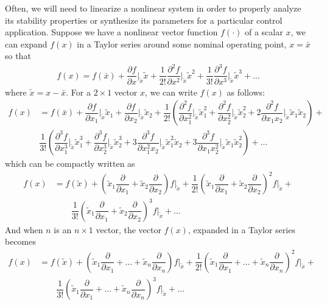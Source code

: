 Often, we will need to linearize a nonlinear system in order to properly analyze its stability properties or synthesize its parameters for a particular control application. Suppose we have a nonlinear vector function $f(\cdot)$ of a scalar $x$, we can expand $f(x)$ in a Taylor series around some nominal operating point, $x = \bar{x}$ so that 
%
\begin{align}
	f(x) = f(\bar{x}) + \dfrac{\partial f}{\partial x} \bigg\rvert_{\tilde{x}} \tilde{x}+ \dfrac{1}{2!} \dfrac{\partial^2f}{\partial x^2} \bigg\rvert_{\tilde{x}} \tilde{x}^2 + \dfrac{1}{3!} \dfrac{\partial^3f}{\partial x^3} \bigg\rvert_{\tilde{x}} \tilde{x}^3 +  \ldots
\end{align}
%
where $\tilde{x} = x - \bar{x}$. For a $2 \times 1$ vector $x$, we can write $f(x)$ as follows:
%
\begin{align}
	f(x) &= f(\bar{x}) + \dfrac{\partial f}{\partial x_1} \bigg\rvert_{\tilde{x}} \tilde{x}_1 + \dfrac{\partial f}{\partial x_2} \bigg\rvert_{\tilde{x}} \tilde{x}_2 + \dfrac{1}{2!} \left(\dfrac{\partial^2f}{\partial x_1^2} \bigg\rvert_{\tilde{x}} \tilde{x}_1^2 + \dfrac{\partial^2f}{\partial x_2^2} \bigg\rvert_{\tilde{x}} \tilde{x}_2^2 + 2 \dfrac{\partial ^2 f}{\partial x_1 x_2}\bigg \rvert_{\tilde{x}} \tilde{x}_1 \tilde{x}_2 \right) + \nonumber \\
	& 
	\dfrac{1}{3!} \left(\dfrac{\partial^3f}{\partial x_1^3} \bigg\rvert_{\tilde{x}} \tilde{x}_1^3 + \dfrac{\partial^3f}{\partial x_2^3} \bigg\rvert_{\tilde{x}} \tilde{x}_2^3 + 3 \dfrac{\partial ^3 f}{\partial x_1^2 x_2}\bigg \rvert_{\tilde{x}} \tilde{x}_1^2  \tilde{x}_2 + 3 \dfrac{\partial ^3 f}{\partial x_1 x_2^2}\bigg \rvert_{\tilde{x}} \tilde{x}_1  \tilde{x}_2^2  \right) + \ldots
\end{align}
 which can be compactly written as 
 \begin{align}
 	f(x) & = f(\tilde{x}) + \left(\tilde{x}_1 \dfrac{\partial}{\partial x_1} + \tilde{x}_2 \dfrac{\partial}{\partial x_2}\right)f\bigg\rvert_{\tilde{x}} +
 	\dfrac{1}{2!} \left(\tilde{x}_1 \dfrac{\partial}{\partial x_1} + \tilde{x}_2 \dfrac{\partial}{\partial x_2}\right)^2f\bigg\rvert_{\tilde{x}} + \nonumber \\
 	& 
 	\qquad \dfrac{1}{3!}\left(\tilde{x}_1 \dfrac{\partial}{\partial x_1} + \tilde{x}_2 \dfrac{\partial}{\partial x_2}\right)^3f\bigg\rvert_{\tilde{x}} + \ldots
 \end{align}
%
And when $n$ is an $n\times 1$ vector, the vector $f(x)$, expanded in a Taylor series becomes
%
\begin{align}
	f(x) &=  f(\tilde{x}) + \left(\tilde{x}_1 \dfrac{\partial}{\partial x_1} + \ldots + \tilde{x}_n \dfrac{\partial}{\partial x_n}\right)f\bigg\rvert_{\tilde{x}} +
	\dfrac{1}{2!} \left(\tilde{x}_1 \dfrac{\partial}{\partial x_1} + \ldots + \tilde{x}_n \dfrac{\partial}{\partial x_n}\right)^2f\bigg\rvert_{\tilde{x}} + \nonumber \\
	& 
	\qquad \dfrac{1}{3!}\left(\tilde{x}_1 \dfrac{\partial}{\partial x_1} + \ldots + \tilde{x}_n \dfrac{\partial}{\partial x_n}\right)^3f\bigg\rvert_{\tilde{x}} + \ldots
\end{align}
